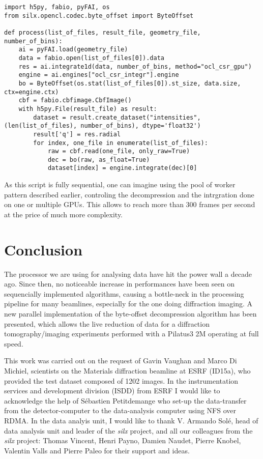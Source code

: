 \documentclass[preprint, pdf]{iucr}              %
\begin{document}
\begin{verbatim}
import h5py, fabio, pyFAI, os
from silx.opencl.codec.byte_offset import ByteOffset

def process(list_of_files, result_file, geometry_file, number_of_bins):
    ai = pyFAI.load(geometry_file)
    data = fabio.open(list_of_files[0]).data
    res = ai.integrate1d(data, number_of_bins, method="ocl_csr_gpu")
    engine = ai.engines["ocl_csr_integr"].engine
    bo = ByteOffset(os.stat(list_of_files[0]).st_size, data.size, ctx=engine.ctx)
    cbf = fabio.cbfimage.CbfImage()
    with h5py.File(result_file) as result:
        dataset = result.create_dataset("intensities", (len(list_of_files), number_of_bins), dtype='float32')
        result['q'] = res.radial
        for index, one_file in enumerate(list_of_files):
            raw = cbf.read(one_file, only_raw=True)
            dec = bo(raw, as_float=True)
            dataset[index] = engine.integrate(dec)[0]
\end{verbatim}

As this script is fully sequential, one can imagine using the pool of worker
pattern described earlier, controling the decompression and the intrgration done
on one or multiple GPUs. This allows to reach more than 300 frames per second at
the price of much more complexity.

\section{Conclusion}

The processor we are using for analysing data have hit the power wall a
decade ago.
Since then,  no noticeable increase in performances have been seen on
sequencially implemented algorithms, causing a bottle-neck in the processing
pipeline for many beamlines, especially for the one doing diffraction imaging.
A new parallel implementation of the byte-offset decompression 
algorithm has been presented, which allows the live reduction of data
for a diffraction tomography/imaging experiments performed with a Pilatus3 2M
operating at full speed.

 
This work was carried out on the request of Gavin Vaughan and Marco Di
Michiel, scientists on the Materials diffraction beamline at ESRF (ID15a), who
provided the test dataset composed of 1202 images.
In the instrumentation services and development division (ISDD) from ESRF I
would like to acknowledge the help of Sébastien Petitdemange who set-up the
data-transfer from the detector-computer to the data-analysis computer using NFS
over RDMA. 
In the data analyis unit, I would like to thank V.
Armando Solé, head of data analysis unit and leader of the \textit{silx} project, and all our colleagues from the \textit{silx}
project:
Thomas Vincent, Henri Payno, Damien Naudet, Pierre Knobel, Valentin Valls and
Pierre Paleo for their support and ideas.



\end{document}
